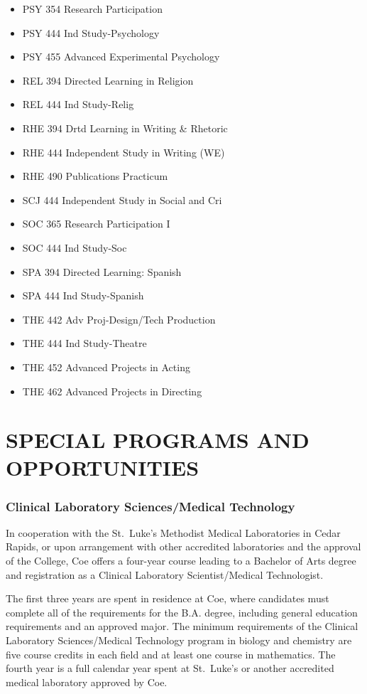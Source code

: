 \documentclass[
  letterpaper,
]{scrbook}
\begin{document}
\begin{itemize}
\item
  PSY 354 Research Participation
\item
  PSY 444 Ind Study-Psychology
\item
  PSY 455 Advanced Experimental Psychology
\item
  REL 394 Directed Learning in Religion
\item
  REL 444 Ind Study-Relig
\item
  RHE 394 Drtd Learning in Writing \& Rhetoric
\item
  RHE 444 Independent Study in Writing (WE)
\item
  RHE 490 Publications Practicum
\item
  SCJ 444 Independent Study in Social and Cri
\item
  SOC 365 Research Participation I
\item
  SOC 444 Ind Study-Soc
\item
  SPA 394 Directed Learning: Spanish
\item
  SPA 444 Ind Study-Spanish
\item
  THE 442 Adv Proj-Design/Tech Production
\item
  THE 444 Ind Study-Theatre
\item
  THE 452 Advanced Projects in Acting
\item
  THE 462 Advanced Projects in Directing
\end{itemize}

\chapter{SPECIAL PROGRAMS AND
OPPORTUNITIES}\label{special-programs-and-opportunities}

\subsection{Clinical Laboratory Sciences/Medical
Technology}\label{clinical-laboratory-sciencesmedical-technology}

In cooperation with the St.~Luke's Methodist Medical Laboratories in
Cedar Rapids, or upon arrangement with other accredited laboratories and
the approval of the College, Coe offers a four-year course leading to a
Bachelor of Arts degree and registration as a Clinical Laboratory
Scientist/Medical Technologist.

The first three years are spent in residence at Coe, where candidates
must complete all of the requirements for the B.A. degree, including
general education requirements and an approved major. The minimum
requirements of the Clinical Laboratory Sciences/Medical Technology
program in biology and chemistry are five course credits in each field
and at least one course in mathematics. The fourth year is a full
calendar year spent at St.~Luke's or another accredited medical
laboratory approved by Coe.
\end{document}
